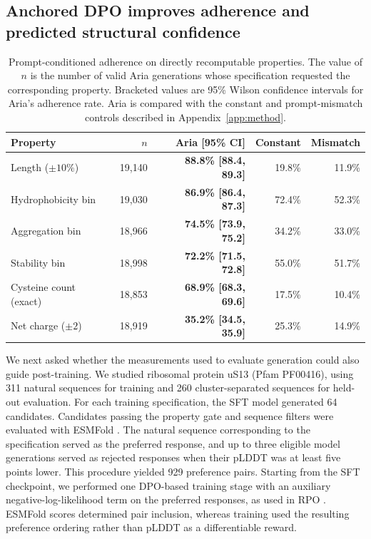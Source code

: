 \documentclass{article}
\newcommand{\pct}{\%}
\begin{document}
\subsection{Anchored DPO improves adherence and predicted structural confidence}
\begin{table}[b]
\caption{Prompt-conditioned adherence on directly recomputable properties.
The value of $n$ is the number of valid Aria generations whose specification
requested the corresponding property. Bracketed values are 95\% Wilson
confidence intervals for Aria's adherence rate. Aria is compared with the
constant and prompt-mismatch controls described in
Appendix~\ref{app:method}.}
\label{tab:controls}
\centering
\small
\begin{tabular}{lrrrr}
\toprule
Property
    & $n$
    & \textbf{Aria [95\% CI]}
    & Constant
    & Mismatch \\
\midrule
Length ($\pm10\pct$)
    & 19{,}140
    & \textbf{88.8\pct{} [88.4, 89.3]}
    & 19.8\pct
    & 11.9\pct \\
Hydrophobicity bin
    & 19{,}030
    & \textbf{86.9\pct{} [86.4, 87.3]}
    & 72.4\pct
    & 52.3\pct \\
Aggregation bin
    & 18{,}966
    & \textbf{74.5\pct{} [73.9, 75.2]}
    & 34.2\pct
    & 33.0\pct \\
Stability bin
    & 18{,}998
    & \textbf{72.2\pct{} [71.5, 72.8]}
    & 55.0\pct
    & 51.7\pct \\
Cysteine count (exact)
    & 18{,}853
    & \textbf{68.9\pct{} [68.3, 69.6]}
    & 17.5\pct
    & 10.4\pct \\
Net charge ($\pm2$)
    & 18{,}919
    & \textbf{35.2\pct{} [34.5, 35.9]}
    & 25.3\pct
    & 14.9\pct \\
\bottomrule
\end{tabular}
\end{table}

We next asked whether the measurements used to evaluate generation could also guide post-training. We studied ribosomal protein uS13 (Pfam PF00416), using 311 natural sequences for training and 260 cluster-separated sequences for held-out evaluation. For each training specification, the SFT model generated 64 candidates. Candidates passing the property gate and sequence filters were evaluated with ESMFold \citep{lin2023esm2}. The natural sequence corresponding to the specification served as the preferred response, and up to three eligible model generations served as rejected responses when their pLDDT was at least five points lower. This procedure yielded 929 preference pairs. Starting from the SFT checkpoint, we performed one DPO-based training stage
\citep{rafailov2023dpo} with an auxiliary negative-log-likelihood term on the
preferred responses, as used in RPO \citep{pang2024rpo}. ESMFold scores determined pair inclusion, whereas training used the resulting preference ordering rather than pLDDT as a differentiable reward.
\end{document}
